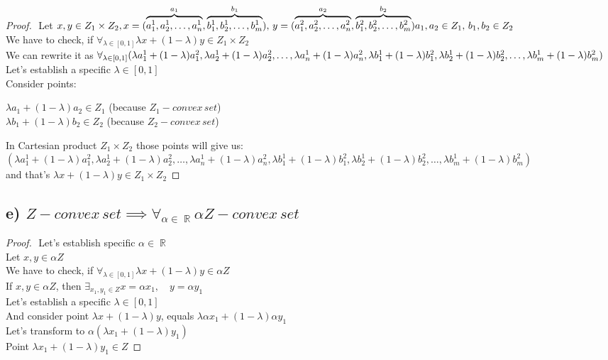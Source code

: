 \documentclass[12pt]{article}
\DeclareMathOperator{\R}{\mathbb{R}}
\begin{document}
\begin{proof}
$ $\newline
Let \(x, y \in Z_1 \times Z_2,\\
x=(\overbrace{ a_1^1, a_2^1, \ldots, a_n^1}^{a_1}, \overbrace{ b_1^1, b_2^1, \ldots, b_m^1}^{b_1}),\,
y=(\overbrace{ a_1^2, a_2^2, \ldots, a_n^2}^{a_2}, \overbrace{ b_1^2, b_2^2, \ldots, b_m^2}^{b_2})\\
a_1,a_2 \in Z_1,\, b_1, b_2 \in Z_2 \)\\
We have to check, if \(\forall_{\lambda \in [0,1]} \lambda x+(1-\lambda)y \in Z_1 \times Z_2\)\\
We can rewrite it as \( \forall_{\lambda \in [0,1]}\\ (\lambda a^1_1+(1-\lambda)a^2_1, \lambda a^1_2+(1-\lambda)a^2_2, \ldots, \lambda a^1_n+(1-\lambda)a^2_n, \lambda b^1_1+(1-\lambda)b^2_1, \lambda b^1_2+(1-\lambda)b^2_2, \ldots, \lambda b^1_m+(1-\lambda)b^2_m ) \) \\
Let's establish a specific \(\lambda \in [0,1]\)\\
Consider points: 
\begin{center}
\(\lambda a_1+(1-\lambda) a_2 \in Z_1\) (because \(Z_1 - convex\,set\))\\ 
\(\lambda b_1+(1-\lambda)b_2 \in Z_2\) (because \(Z_2 - convex\,set\))
\end{center}
In Cartesian product \(Z_1 \times Z_2\) those points will give us:\\
\((\lambda a^1_1+(1-\lambda)a^2_1, \lambda a^1_2+(1-\lambda)a^2_2, \ldots, \lambda a^1_n+(1-\lambda)a^2_n, \lambda b^1_1+(1-\lambda)b^2_1, \lambda b^1_2+(1-\lambda)b^2_2, \ldots, \lambda b^1_m+(1-\lambda)b^2_m ) \)\\
and that's \(\lambda x+(1-\lambda)y \in Z_1 \times Z_2\)
\end{proof}

\subsection*{e) \( Z - convex\,set \implies \forall_{\alpha \in \R} \alpha Z - convex\,set\)}
\begin{proof}
$ $\newline
Let's establish specific \(\alpha \in \R\)\\
Let \(x, y \in \alpha Z\)\\
We have to check, if \(\forall_{\lambda \in [0,1]} \lambda x+(1-\lambda)y \in \alpha Z \)\\
If \(x,y \in \alpha Z\), then \(\exists_{x_1, y_1 \in Z} x=\alpha x_1,\quad y=\alpha y_1\)\\
Let's establish a specific \(\lambda \in [0,1]\)\\
And consider point \(\lambda x+(1-\lambda)y\), equals \(\lambda \alpha x_1+(1-\lambda)\alpha y_1\)\\
Let's transform to \(\alpha(\lambda  x_1+(1-\lambda) y_1)\)\\
Point \(\lambda  x_1+(1-\lambda) y_1 \in Z\) 
\end{proof}
\newpage
\end{document}
